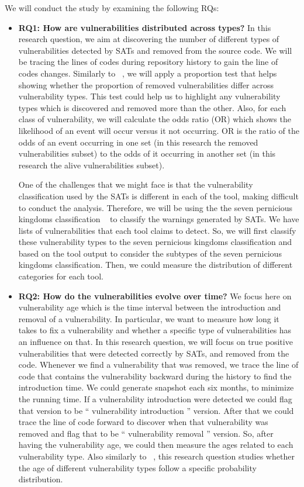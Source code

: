 

We will conduct the study by examining the following RQs: 

\begin{itemize}
\item \textbf{RQ1: How are vulnerabilities distributed across types?}
In this research question, we aim at discovering
the number of different types of vulnerabilities detected by SATs
and removed from the source code. We will be tracing the lines of codes
during repository history to gain the line of codes changes. 
Similarly to ~\cite{di2009life},  we will apply a proportion test
that helps showing whether the proportion of removed vulnerabilities 
differ across vulnerability types.  
This test could help us to highlight any vulnerability types
which is discovered and removed more than the other. 
Also, for each class of vulnerability, 
we will calculate the odds ratio (OR) 
which shows the likelihood of an event will occur versus it not occurring. 
OR is the ratio of the odds of an event occurring
in one set (in this research the removed vulnerabilities subset)
to the odds of it occurring in another set (in this research the alive vulnerabilities subset). 


One of the challenges that we might face is that
the vulnerability classification used by the SATs is different in each of the tool, 
making difficult to conduct the analysis. 
Therefore, we will be using the the seven pernicious kingdoms classification ~\cite{tsipenyuk2005seven} 
to classify the  warnings generated by SATs. 
We have lists of vulnerabilities that each tool claims to detect. 
So, we will first classify these vulnerability types to the seven
pernicious kingdoms classification and based on the tool output
to consider the subtypes of the seven pernicious kingdoms classification.
Then, we could measure the distribution of different categories for each tool.

\item \textbf{RQ2: How do the vulnerabilities evolve over time?}
We focus here on vulnerability age which is the time interval
between the introduction and removal of a vulnerability.  
In particular, we want to measure how long it takes to fix a vulnerability
and whether a specific type of vulnerabilities has an influence on that. 
In this research question, we will focus on true positive vulnerabilities
that were detected correctly by SATs, and removed from the code. 
Whenever we find a vulnerability that was removed, 
we trace the line of code that contains the vulnerability backward
during the history to find the introduction time.  
We could generate snapshot each six months, to minimize the running time.
If a vulnerability introduction were detected we could flag that version
to be `` vulnerability introduction '' version. 
After that we could trace the line of code forward to discover
when that vulnerability was removed and flag that to be `` vulnerability removal '' version. 
So, after having the vulnerability age, 
we could then measure the ages related to each vulnerability type.  
Also similarly to ~\cite{di2009life}, this research question studies
whether the age of different vulnerability types follow a specific probability distribution.




\end{itemize}
